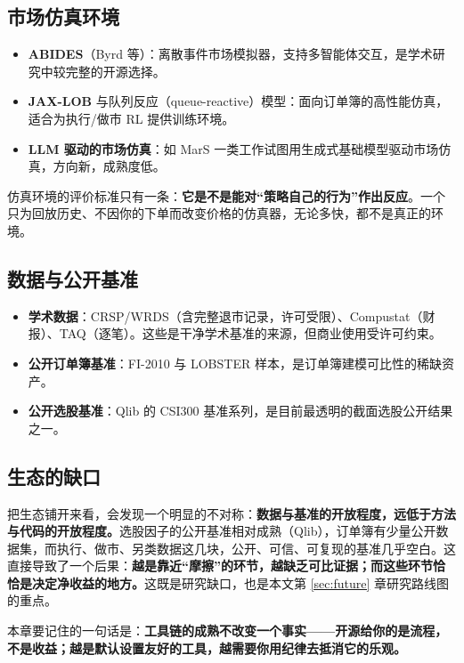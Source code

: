 \subsection{市场仿真环境}

\begin{itemize}
  \item \textbf{ABIDES}（Byrd 等\cite{byrd2020abides}）：离散事件市场模拟器，支持多智能体交互，是学术研究中较完整的开源选择。
  \item \textbf{JAX-LOB} 与队列反应（queue-reactive）模型：面向订单簿的高性能仿真，适合为执行/做市 RL 提供训练环境。
  \item \textbf{LLM 驱动的市场仿真}：如 MarS 一类工作试图用生成式基础模型驱动市场仿真，方向新，成熟度低。
\end{itemize}

仿真环境的评价标准只有一条：\textbf{它是不是能对“策略自己的行为”作出反应}。一个只为回放历史、不因你的下单而改变价格的仿真器，无论多快，都不是真正的环境。

\subsection{数据与公开基准}

\begin{itemize}
  \item \textbf{学术数据}：CRSP/WRDS（含完整退市记录，许可受限）、Compustat（财报）、TAQ（逐笔）。这些是干净学术基准的来源，但商业使用受许可约束。
  \item \textbf{公开订单簿基准}：FI-2010\cite{ntakaris2018fi2010} 与 LOBSTER 样本，是订单簿建模可比性的稀缺资产。
  \item \textbf{公开选股基准}：Qlib 的 CSI300 基准系列，是目前最透明的截面选股公开结果之一。
\end{itemize}

\subsection{生态的缺口}

把生态铺开来看，会发现一个明显的不对称：\textbf{数据与基准的开放程度，远低于方法与代码的开放程度。}选股因子的公开基准相对成熟（Qlib），订单簿有少量公开数据集，而执行、做市、另类数据这几块，公开、可信、可复现的基准几乎空白。这直接导致了一个后果：\textbf{越是靠近“摩擦”的环节，越缺乏可比证据；而这些环节恰恰是决定净收益的地方。}这既是研究缺口，也是本文第 \ref{sec:future} 章研究路线图的重点。

本章要记住的一句话是：\textbf{工具链的成熟不改变一个事实——开源给你的是流程，不是收益；越是默认设置友好的工具，越需要你用纪律去抵消它的乐观。}
